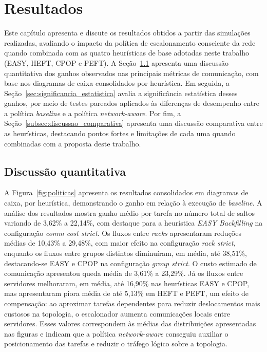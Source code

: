 \documentclass[12pt]{article}
\begin{document}
\section{Resultados}
\label{sec:resultados_discussao}

Este capítulo apresenta e discute os resultados obtidos a partir das simulações realizadas, avaliando o impacto da política de escalonamento consciente da rede quando combinada com as quatro heurísticas de base adotadas neste trabalho (EASY, HEFT, CPOP e PEFT). A Seção~\ref{subsec:discussao_quantitativa} apresenta uma discussão quantitativa dos ganhos observados nas principais métricas de comunicação, com base nos diagramas de caixa consolidados por heurística. Em seguida, a Seção~\ref{sec:significancia_estatistica} avalia a significância estatística desses ganhos, por meio de testes pareados aplicados às diferenças de desempenho entre a política \textit{baseline} e a política \textit{network-aware}. Por fim, a Seção~\ref{subsec:discussao_comparativa} apresenta uma discussão comparativa entre as heurísticas, destacando pontos fortes e limitações de cada uma quando combinadas com a proposta deste trabalho.


\subsection{Discussão quantitativa}
\label{subsec:discussao_quantitativa}

A Figura~\ref{fig:politicas} apresenta os resultados consolidados em diagramas de caixa, por heurística, demonstrando o ganho em relação à execução de \textit{baseline}.
%
A análise dos resultados mostra ganho médio por tarefa no número total de saltos variando de 3,62\% a 22,14\%, com destaque para a heurística \textit{EASY Backfilling} na configuração \textit{comm cost strict}. 
%
Os fluxos entre \textit{racks} apresentaram reduções médias de 10,43\% a 29,48\%, com maior efeito na configuração \textit{rack strict}, enquanto os fluxos entre grupos distintos diminuíram, em média, até 38,51\%, destacando-se EASY e CPOP na configuração \textit{group strict}. 
%
O custo estimado de comunicação apresentou queda média de 3,61\% a 23,29\%. 
%
Já os fluxos entre servidores melhoraram, em média, até 16,90\% nas heurísticas EASY e CPOP, mas apresentaram piora média de até 5,13\% em HEFT e PEFT, um efeito de compensação: ao aproximar tarefas dependentes para reduzir deslocamentos mais custosos na topologia, o escalonador aumenta comunicações locais entre servidores. 
%
Esses valores correspondem às médias das distribuições apresentadas nas figuras e indicam que a política \textit{network-aware} conseguiu auxiliar o posicionamento das tarefas e reduzir o tráfego lógico sobre a topologia.
\end{document}
